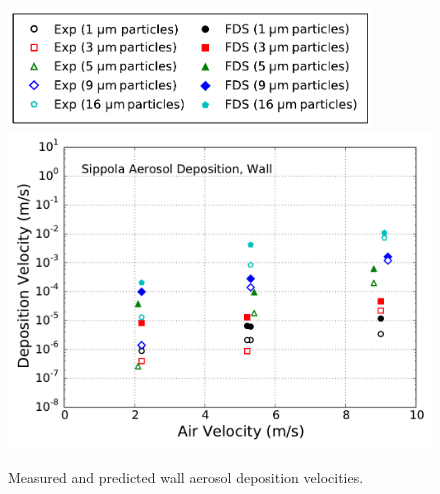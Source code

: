 \begin{figure}[p]
\centering
\includegraphics[width=3.8in]{Fig_Sippola_Aerosol_Deposition_Legend.pdf} \\
\includegraphics[width=5.0in]{Fig_Sippola_Aerosol_Wall_Deposition.pdf}
\caption[Wall aerosol deposition velocities]
{Measured and predicted wall aerosol deposition velocities.}
\label{fig:Sippola_Aerosol_Deposition_Velocity_2}
\end{figure}

